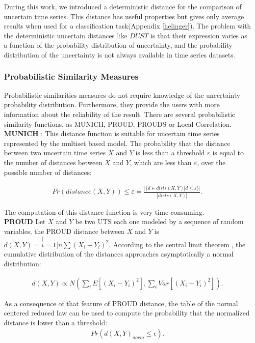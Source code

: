 During this work, we introduced a deterministic distance for the comparison of uncertain time series. This distance has useful properties but gives only average results when used for a classification task(Appendix \ref{helinger}). The problem with the deterministic uncertain distances like $DUST$ is that their expression varies as a function of the probability distribution of uncertainty,  and the probability distribution of the uncertainty is not always available in time series datasets.


\subsubsection{Probabilistic Similarity Measures}
Probabilistic similarities measures do not require knowledge of the uncertainty probability distribution. Furthermore, they provide the users with more information about the reliability of the result. There are several probabilistic similarity functions, as MUNICH, PROUD, PROUDS or Local Correlation. 
\\
\textbf{MUNICH} \cite{assfalg2009probabilistic}:
This distance function is suitable for uncertain time series represented by the multiset based model. The probability that the distance between two uncertain time series $X$ and $Y$ is less than a threshold $\varepsilon$ is equal to the number of distances between $X$ and $Y$, which are less than $\varepsilon$, over the possible number of distances:

\begin{eqnarray}
Pr(distance(X,Y))\leq\varepsilon=\frac{|\{d\in
dists(X,Y)|d\leq\varepsilon\}|}{|dists(X,Y)|}.
\end{eqnarray}

The computation of this distance function is very time-consuming.
\\
\textbf{PROUD} \cite{yeh2009proud} Let $X$ and $Y$ be two UTS each one modeled  by a sequence of random variables, the PROUD distance between $X$ and $Y$ is $d(X,Y)=\stackrel[i=1]{n}{\sum}(X_{i}-Y_{i})^{2}.$
According to the central limit theorem \cite{hoffmann1976law}, the cumulative distribution of the distances approaches asymptotically a normal distribution:

\begin{eqnarray}
d(X,Y)\propto
N(\underset{i}{\sum}E[(X_{i}-Y_{i})^{2}],\underset{i}{\sum}Var[(X_{i}-Y_{i})^{2}]).
\end{eqnarray}

As a consequence of that feature of PROUD distance,  the table of the normal centered reduced law can be used to compute the probability that the normalized distance is lower than a threshold:
\begin{eqnarray}
Pr(d(X,Y)_{norm}\leq\epsilon).
\end{eqnarray} 

